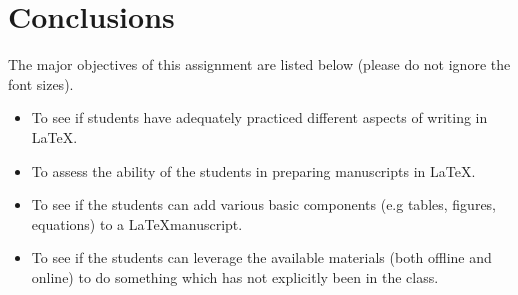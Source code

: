 \documentclass[14pt, a4paper]{article} %
\begin{document}
    \section{Conclusions}
    The major objectives of this assignment are listed below (please do not ignore the font sizes).
    \begin{itemize}
     \item{\Huge{To see if students have adequately practiced different aspects of writing in \LaTeX.}} \pagebreak
     \item{\LARGE{To assess the ability of the students in preparing manuscripts in \LaTeX.}}
     \item{{To see if the students can add various basic components (e.g tables, figures, equations) to a \LaTeX manuscript.}}
     \item{To see if the students can leverage the available materials (both offline and online) to do something which has not explicitly been in the class.}
    \end{itemize}
	
\end{document}
